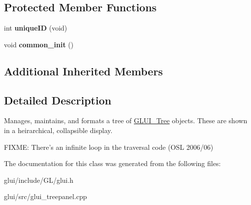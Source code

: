\subsection*{Protected Member Functions}
\begin{DoxyCompactItemize}
\item 
\hypertarget{classGLUI__TreePanel_aeb4b329f0f779c8f289c3efdb9ecd258}{int {\bfseries unique\-I\-D} (void)}\label{classGLUI__TreePanel_aeb4b329f0f779c8f289c3efdb9ecd258}

\item 
\hypertarget{classGLUI__TreePanel_a0584049c802c2074a86367053b2d2e20}{void {\bfseries common\-\_\-init} ()}\label{classGLUI__TreePanel_a0584049c802c2074a86367053b2d2e20}

\end{DoxyCompactItemize}
\subsection*{Additional Inherited Members}


\subsection{Detailed Description}
Manages, maintains, and formats a tree of \hyperlink{classGLUI__Tree}{G\-L\-U\-I\-\_\-\-Tree} objects. These are shown in a heirarchical, collapsible display.

F\-I\-X\-M\-E\-: There's an infinite loop in the traversal code (O\-S\-L 2006/06) 

The documentation for this class was generated from the following files\-:\begin{DoxyCompactItemize}
\item 
glui/include/\-G\-L/glui.\-h\item 
glui/src/glui\-\_\-treepanel.\-cpp\end{DoxyCompactItemize}
